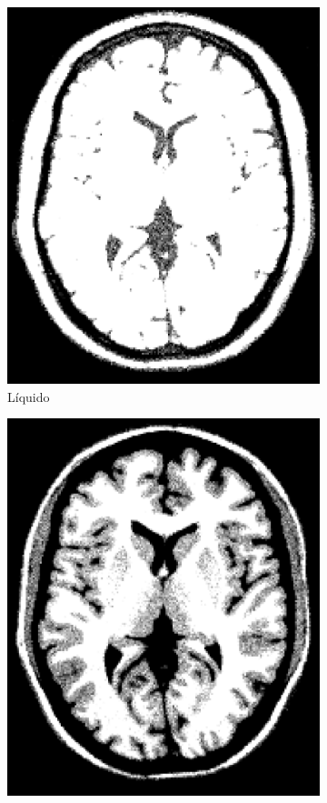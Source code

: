 \documentclass[letterpaper,12pt]{article}
\theoremstyle{plain}
\begin{document}
\begin{figure}[H]
\begin{subfigure}[h]{0.24\linewidth}
            \includegraphics[width=\textwidth]{Figuras/ImageA_25_62.png}
            \caption{Líquido} 
         \end{subfigure}
         \begin{subfigure}[h]{0.24\linewidth}
            \centering
            \includegraphics[width=\textwidth]{Figuras/ImageA_62_113.png}

\end{subfigure}
\end{figure}
\end{document}
